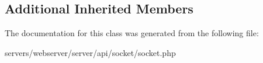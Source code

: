 \subsection*{Additional Inherited Members}


The documentation for this class was generated from the following file\+:\begin{DoxyCompactItemize}
\item 
servers/webserver/server/api/socket/socket.\+php\end{DoxyCompactItemize}
